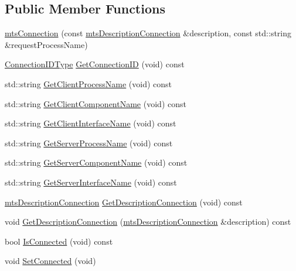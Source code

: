 \subsection*{Public Member Functions}
\begin{DoxyCompactItemize}
\item 
\hyperlink{classmts_connection_a071972ee336069bba608bd6737251c80}{mts\-Connection} (const \hyperlink{classmts_description_connection}{mts\-Description\-Connection} \&description, const std\-::string \&request\-Process\-Name)
\item 
\hyperlink{mts_forward_declarations_8h_ad3543bb11742e1766374ec96016d6547}{Connection\-I\-D\-Type} \hyperlink{classmts_connection_a0cdb99db04bf430b6d66d101a06632e7}{Get\-Connection\-I\-D} (void) const 
\item 
std\-::string \hyperlink{classmts_connection_a863c48dc7afc08a3cf46daa8baefc71d}{Get\-Client\-Process\-Name} (void) const 
\item 
std\-::string \hyperlink{classmts_connection_a3121c2b3b8b866c02061f1933cb6dbb3}{Get\-Client\-Component\-Name} (void) const 
\item 
std\-::string \hyperlink{classmts_connection_a9e646b120e7922e1cc541b3cd76f8cdc}{Get\-Client\-Interface\-Name} (void) const 
\item 
std\-::string \hyperlink{classmts_connection_a7238662b0ee1b16715b154bdc3e7d2b1}{Get\-Server\-Process\-Name} (void) const 
\item 
std\-::string \hyperlink{classmts_connection_a5840d98170336716c9e12b0790807b01}{Get\-Server\-Component\-Name} (void) const 
\item 
std\-::string \hyperlink{classmts_connection_a846f0404697261cd08493abbd9fe0b23}{Get\-Server\-Interface\-Name} (void) const 
\item 
\hyperlink{classmts_description_connection}{mts\-Description\-Connection} \hyperlink{classmts_connection_a57ce93d13a639abfde415fce5aea3b4f}{Get\-Description\-Connection} (void) const 
\item 
void \hyperlink{classmts_connection_a8cf4f6f7a4fb474edb6a853d9365d751}{Get\-Description\-Connection} (\hyperlink{classmts_description_connection}{mts\-Description\-Connection} \&description) const 
\item 
bool \hyperlink{classmts_connection_ae9b6fd039a212ad72e7ccfd4a290cf25}{Is\-Connected} (void) const 
\item 
void \hyperlink{classmts_connection_ab6500a009f3f07c65be009eb7b6acd2f}{Set\-Connected} (void)
\item 

\end{DoxyCompactItemize}
